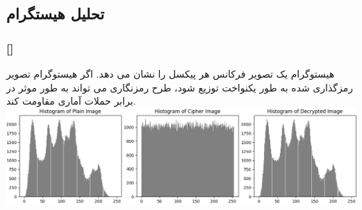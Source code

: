 \documentclass[xcolor=dvipsnames, professionalfonts, 11pt]{beamer}
\newcommand*{\makeframetitle}{\frametitle{\insertsection \hspace{0.1em} {\footnotesize [\insertsubsection]}}}
\begin{document}
\subsection{تحلیل هیستگرام}
\begin{frame}
    \makeframetitle
    هیستوگرام یک تصویر فرکانس هر پیکسل را نشان می دهد. اگر هیستوگرام تصویر رمزگذاری شده به طور یکنواخت توزیع شود، طرح رمزنگاری می تواند به طور موثر در برابر حملات آماری مقاومت کند.
    \vfill
    \includegraphics[width=\textwidth]{assets/result07.png}
\end{frame}
\end{document}
